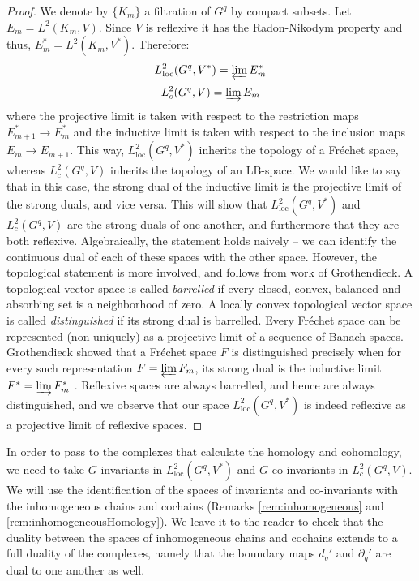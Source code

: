 \documentclass[12pt,reqno]{amsart}
\theoremstyle{definition}
\begin{document}
\begin{proof}
    We denote by $\{K_m\}$ a filtration of $G^q$ by compact subsets. Let $E_m=L^2(K_m,V)$. Since $V$ is reflexive it has the Radon-Nikodym property and thus, $E_m^* = L^2(K_m,V^*)$. Therefore:
    $$L^2_{\mathrm{loc}}(G^q,V^*)= \varprojlim E_m^*$$
    $$L^2_c(G^q,V)= \varinjlim E_m$$
    where the projective limit is taken with respect to the restriction maps $E^*_{m+1} \rightarrow E^*_m$ and the inductive limit is taken with respect to the inclusion maps $E_m \rightarrow E_{m+1}$. This way, $L^2_{\mathrm{loc}}(G^{q},V^*)$ inherits the topology of a Fr\'echet space, whereas $L^2_c(G^q,V)$ inherits the topology of an LB-space. We would like to say that in this case, the strong dual of the inductive limit is the projective limit of the strong duals, and vice versa. This will show that $L^2_{\mathrm{loc}}(G^{q},V^*)$ and $L^2_c(G^{q},V)$ are the strong duals of one another, and furthermore that they are both reflexive. Algebraically, the statement holds naively -- we can identify the continuous dual of each of these spaces with the other space.  However, the topological statement is more involved, and follows from work of Grothendieck. A topological vector space is called \emph{barrelled} if every closed, convex, balanced and absorbing set is a neighborhood of zero. A locally convex topological vector space is called \emph{distinguished} if its strong dual is barrelled. Every Fr\'echet space can be represented (non-uniquely) as a projective limit of a sequence of Banach spaces. Grothendieck showed that a Fr\'echet space $F$ is distinguished precisely when for every such representation $F=\varprojlim F_m$, its strong dual is the inductive limit $F^*=\varinjlim F_m^*$ \cite{Distinguished}. Reflexive spaces are always barrelled, and hence are always distinguished, and we observe that our space $L^2_{\mathrm{loc}}(G^q,V^*)$ is indeed reflexive as a projective limit of reflexive spaces.
\end{proof}
In order to pass to the complexes that calculate the homology and cohomology, we need to take $G$-invariants in $L^2_{\mathrm{loc}}(G^{q},V^*)$ and $G$-co-invariants in $L^2_c(G^{q},V)$. We will use the identification of the spaces of invariants and co-invariants with the inhomogeneous chains and cochains (Remarks \ref{rem:inhomogeneous} and \ref{rem:inhomogeneousHomology}). We leave it to the reader to check that the duality between the spaces of inhomogeneous chains and cochains extends to a full duality of the complexes, namely that the boundary maps $d_q'$ and $\partial_q'$ are dual to one another as well.
\end{document}
